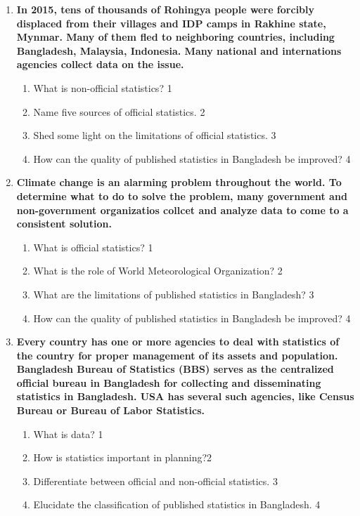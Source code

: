 \documentclass[a4paper,oneside]{book}
\begin{document}
  \begin{enumerate}
 \item
	  \textbf{In 2015, tens of thousands of Rohingya people were forcibly displaced from their villages and IDP camps in Rakhine state, Mynmar. Many of them fled to neighboring countries, including Bangladesh, Malaysia, Indonesia. Many national and internations agencies collect data on the issue.} 
  
  \begin{enumerate}
    \item
	What is non-official statistics? \hfill 1
    \item
	Name five sources of official statistics. \hfill 2
    \item  
	Shed some light on the limitations of official statistics. \hfill 3
    \item
	How can the quality of published statistics in Bangladesh be improved? \hfill 4
  \end{enumerate}
  
   \item
	  \textbf{Climate change is an alarming problem throughout the world. To determine what to do to solve the problem, many government and non-government organizatios collcet and analyze data  to come to a consistent solution.} 
  
  \begin{enumerate}
    \item
	What is official statistics?  \hfill 1
    \item
	What is the role of World Meteorological Organization? \hfill 2
    \item  
	What are the limitations of published statistics in Bangladesh? \hfill 3
    \item
	How can the quality of published statistics in Bangladesh be improved? \hfill 4
  \end{enumerate}


   \item
	  \textbf{Every country has one or more agencies to deal with statistics of the country for proper management of its assets and population. Bangladesh Bureau of Statistics (BBS) serves as the centralized official bureau in Bangladesh for collecting and disseminating statistics in Bangladesh. USA has several such agencies, like Census Bureau or Bureau of Labor Statistics.} 
  
  \begin{enumerate}
    \item
	What is data? \hfill 1
    \item
	How is statistics important in planning?\hfill 2
    \item  
	Differentiate between official and non-official statistics. \hfill 3
    \item
	Elucidate the classification of published statistics in Bangladesh.  \hfill 4
  \end{enumerate}


\end{enumerate}
\end{document}
